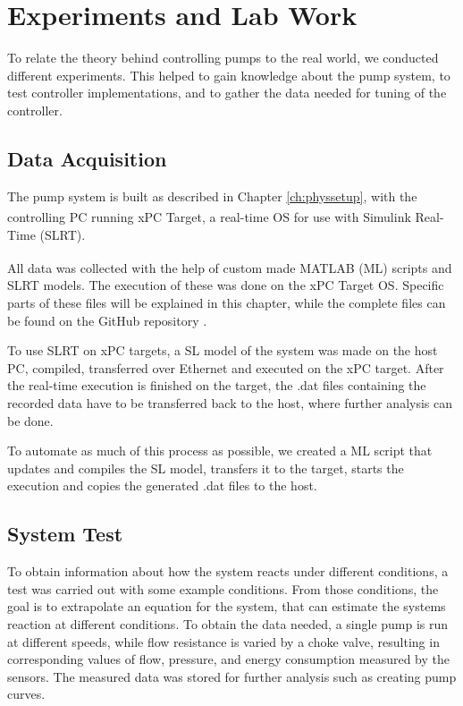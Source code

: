 \chapter{Experiments and Lab Work}\label{ch:experiment}
To relate the theory behind controlling pumps to the real world,
we conducted different experiments.
This helped to gain knowledge about the pump system,
to test controller implementations, and to gather the data needed for tuning of the controller.

\section{Data Acquisition}\label{sec:data_gathering}
The pump system is built as described in Chapter \ref{ch:physsetup},
with the controlling PC running xPC Target,
a real-time OS for use with
Simulink\textsuperscript{\textregistered{}} Real-Time\texttrademark{}
(SLRT). 

All data was collected with the help of custom made MATLAB\textsuperscript{\textregistered{}}
(ML) scripts and SLRT models.
The execution of these was done on the xPC Target OS.
Specific parts of these files will be explained in this chapter,
while the complete files can be found on the GitHub repository \cite{GitHub}.

To use SLRT on xPC targets, a SL model of the system was made on the host PC,
compiled, transferred over Ethernet and executed on the xPC target.
After the real-time execution is finished on the target,
the .dat files containing the recorded data have to be transferred back to the host,
where further analysis can be done.

To automate as much of this process as possible,
we created a ML script that updates and compiles the SL model, transfers it to the target,
starts the execution and copies the generated .dat files to the host.

\section{System Test}\label{sec:system_test} 
To obtain information about how the system reacts under different conditions,
a test was carried out with some example conditions.
From those conditions, the goal is to extrapolate an equation for the system,
that can estimate the systems reaction at different conditions.
To obtain the data needed,
a single pump is run at different speeds,
while flow resistance is varied by a choke valve,
resulting in corresponding values of flow, pressure, and energy consumption
measured by the sensors.
The measured data was stored for further analysis such as creating pump curves.

